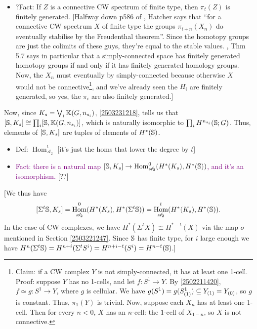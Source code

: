 \documentclass{MetricNotes2023}
\def\bb{\ensuremath\mathbb}
\def\subq{\ensuremath\subseteq}
\def\A{\ensuremath{\mathscr{A}_2}}
\DeclareMathOperator{\Hom}{Hom}
\def\textcolour{\textcolor}
\begin{document}
\begin{itemize}
\item ?Fact: If \(Z\) is a connective CW spectrum of finite type, then \(\pi_t(Z)\) is finitely generated. [Halfway down p586 of \autocite{hatcher5}, Hatcher says that ``for a connective CW spectrum \(X\) of finite type the groups \(\pi_{i+n}(X_n)\) do eventually stabilise by the Freudenthal theorem''. Since the homotopy groups are just the colimits of these guys, they're equal to the stable values. \autocite{hatcher}, Thm 5.7 says in particular that a simply-connected space has finitely generated homotopy groups if and only if it has finitely generated homology groups. Now, the \(X_n\) must eventually by simply-connected because otherwise \(X\) would not be connective\footnote{Claim: if a CW complex \(Y\) is not simply-connected, it has at least one 1-cell. Proof: suppose \(Y\) has no 1-cells, and let \(f : S^1 \to Y\). By \ref{2502211420}, \(f\simeq g : S^1 \to Y\), where \(g\) is cellular. We have \(g(S^1)=g(S^1_{(1)})\subq Y_{(1)}=Y_{(0)}\), so \(g\) is constant. Thus, \(\pi_1(Y)\) is trivial. Now, suppose each \(X_n\) has at least one 1-cell. Then for every \(n <0\), \(X\) has an \(n\)-cell: the \(1\)-cell of \(X_{1-n}\), so \(X\) is not connective.}, and we've already seen the \(H_i\) are finitely generated, so yes, the \(\pi_i\) are also finitely generated.]
\end{itemize}

Now, since \(K_s = \bigvee_i \bb{K}(G, n_{s_i})\),  \ref{2503231218}, tells us that \([\bb{S}, K_s]\cong \prod_i[\bb{S}, \bb{K}(G, n_{s_i})]\), which is naturally isomorphic to \(\prod_i H^{n_{s_i}}(\bb{S}; G)\). Thus, elements of \([\bb{S}, K_s]\) are tuples of elements of \(H^*(\bb{S})\).

\begin{itemize}
\item Def: \(\Hom^t_{\A}\) [it's just the homs that lower the degree by \(t\)]

\item \textcolour{purple}{Fact: there is a natural map \([\bb{S}, K_s]\to \Hom^0_{\A}(H^*(K_s), H^*(\bb{S}))\), and it's an isomorphism.} [??]
\end{itemize}

[We thus have
\[[\Sigma^t \bb{S}, K_s]=\Hom^0_{\A}(H^*(K_s), H^*(\Sigma^t \bb{S}))=\Hom^t_{\A}(H^*(K_s), H^*(\bb{S})).\]
In the case of CW complexes, we have \(H^*(\Sigma^t X)\cong H^{*-t}(X)\) via the map \(\sigma\) mentioned in Section  \ref{2503221247}. Since \(\bb{S}\) has finite type, for \(i\) large enough we have \(H^n(\Sigma^t\bb{S})=H^{n+i}(\Sigma^t S^i)=H^{n+i-t}(S^i)=H^{n-t}(\bb{S})\).]
\end{document}
